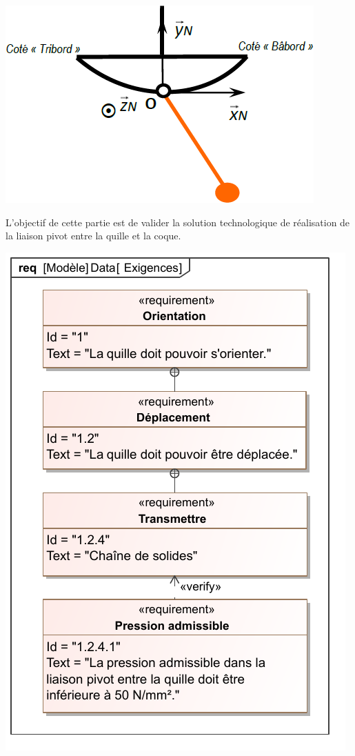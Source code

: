 \documentclass[10pt,fleqn]{article} %
\begin{document}
\begin{multicols}{2}
\begin{center}
\includegraphics[width=.8\linewidth]{images/fig_02}
\end{center}
\fi
\begin{obj}
L’objectif de cette partie est de valider la solution technologique de réalisation de la liaison pivot  entre la quille et la coque.
\end{obj}

\ifprof
\else

\begin{center}
\includegraphics[width=.95\linewidth]{images/Exigences}
\end{center}
\fi

\end{multicols}
\end{document}
